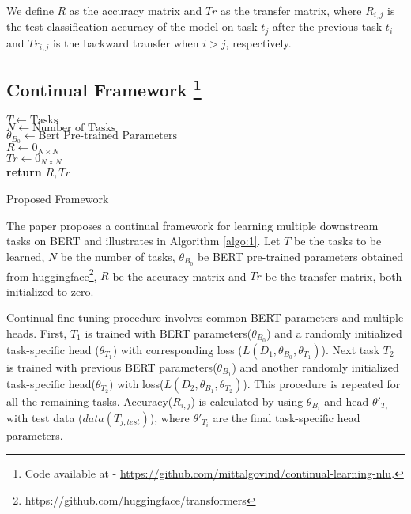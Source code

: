 \documentclass[11pt,a4paper]{article}
\begin{document}
We define $R$ as the accuracy matrix and $Tr$ as the transfer matrix, where $R_{i, j}$ is the test classification accuracy of the model on task $t_j$ after the previous task $t_i$ and $Tr_{i, j}$ is the backward transfer when $i > j$, respectively.

\subsection{Continual Framework
\footnote{Code available at - \url{https://github.com/mittalgovind/continual-learning-nlu}.}}

\begin{algorithm}
    $T \leftarrow \mbox{Tasks}$ \\
    $N \leftarrow \mbox{Number of Tasks}$ \\
    $\theta_{B_0} \leftarrow \mbox{Bert Pre-trained Parameters}$\\
    $R \leftarrow 0_{N \times N}$ \\
    $Tr \leftarrow 0_{N \times N}$ \\
    \textbf{return} $R, Tr$
    \caption{Proposed Framework}
    \label{algo:1}
\end{algorithm}

The paper proposes a continual framework for learning multiple downstream tasks on BERT and illustrates in Algorithm \ref{algo:1}. Let $T$ be the tasks to be learned, $N$ be the number of tasks, $\theta_{B_0}$ be BERT pre-trained parameters obtained from huggingface\footnote{https://github.com/huggingface/transformers}, $R$ be the accuracy matrix and $Tr$ be the transfer matrix, both initialized to zero.


Continual fine-tuning procedure involves common BERT parameters and multiple heads. First, $T_{1}$ is trained with BERT parameters($\theta_{B_0}$) and a randomly initialized task-specific head ($\theta_{T_1}$) with corresponding loss ($L (D_1,  \theta_{B_{0}}, \theta_{T_1})$). Next task $T_2$ is trained with previous BERT parameters($\theta_{B_1}$) and another randomly initialized task-specific head($\theta_{T_2}$) with loss($L (D_2,  \theta_{B_{1}}, \theta_{T_2})$). This procedure is repeated for all the remaining tasks. Accuracy($R_{i,j}$) is calculated by using $\theta_{B_i}$ and head $\theta'_{T_i}$ with test data ($data (T_{j, test})$), where $\theta'_{T_i}$ are the final task-specific head parameters.
\end{document}
